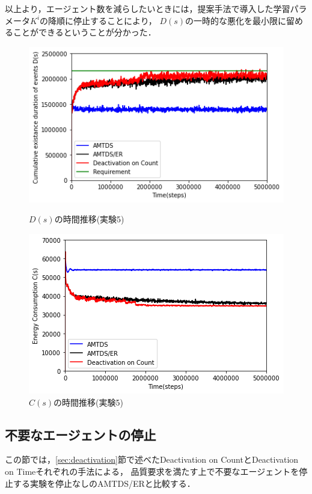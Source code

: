 \documentclass[12pt,a4j,twoside]{jarticle}
\begin{document}
  以上より，エージェント数を減らしたいときには，提案手法で導入した学習パラメータ$K^i$の降順に停止することにより，
  $D(s)$の一時的な悪化を最小限に留めることができるということが分かった．


  \begin{figure}
    \centering
    \includegraphics[width=0.9\hsize]{figures/ds_graph_3600_ave_CountStop_Office_600.png}
    \caption{$D(s)$の時間推移(実験5)}
    \label{fig:ds_CountStop}
    \vspace{12pt}
    \centering
    \includegraphics[width=0.9\hsize]{figures/cs_graph_3600_ave_CountStop_Office_600.png}
    \caption{$C(s)$の時間推移(実験5)}
    \label{fig:cs_CountStop}
  \end{figure}


  \subsection{不要なエージェントの停止}\label{ex:deactivation}
  この節では，\ref{sec:deactivation}節で述べたDeactivation on CountとDeactivation on Timeそれぞれの手法による，
  品質要求を満たす上で不要なエージェントを停止する実験を停止なしのAMTDS/ERと比較する．
\end{document}
